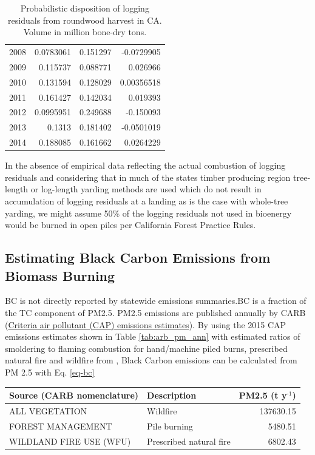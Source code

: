 \documentclass[a4paper]{article}
\begin{document}
\begin{table}[htb]
\begin{tabular}{rrrr}
2008 & 0.0783061 & 0.151297 & -0.0729905\\
2009 & 0.115737 & 0.088771 & 0.026966\\
2010 & 0.131594 & 0.128029 & 0.00356518\\
2011 & 0.161427 & 0.142034 & 0.019393\\
2012 & 0.0995951 & 0.249688 & -0.150093\\
2013 & 0.1313 & 0.181402 & -0.0501019\\
2014 & 0.188085 & 0.161662 & 0.0264229\\
\end{tabular}
\caption{Probabilistic disposition of logging residuals from roundwood harvest in CA. Volume in million bone-dry tons.}

\end{table}

In the absence of empirical data reflecting the actual combustion of logging residuals and considering that in much of the states timber producing region tree-length or log-length yarding methods are used which do not result in accumulation of logging residuals at a landing as is the case with whole-tree yarding, we might assume 50\% of the logging residuals not used in bioenergy would be burned in open piles per California Forest Practice Rules. 

\subsection{Estimating Black Carbon Emissions from Biomass Burning}
\label{sec:orgheadline6}

\acf{BC} is not directly reported by statewide emissions summaries.\ac{BC} is a fraction of the \ac{TC} component of \ac{PM2.5}. \ac{PM2.5} emissions are published annually by \ac{CARB} (\href{http://www.arb.ca.gov/ei/emissiondata.htm}{Criteria air pollutant (CAP) emissions estimates}). 
By using the 2015 CAP emissions estimates shown in Table \ref{tab:arb_pm_ann} with estimated ratios of 
smoldering to flaming combustion for hand/machine piled burns, prescribed 
natural fire and wildfire from \citet{Ward1989}, Black Carbon emissions
can be calculated from PM
2.5 with Eq. \eqref{eq-bc}


\begin{center}
\begin{tabular}{llr}
Source (\ac{CARB} nomenclature) & Description & \ac{PM2.5} (t y\(^{\text{-1}}\))\\
\hline
ALL VEGETATION & Wildfire & 137630.15\\
FOREST MANAGEMENT & Pile burning & 5480.51\\
WILDLAND FIRE USE (WFU) & Prescribed natural fire & 6802.43\\
\end{tabular}

\end{center}
\end{document}
